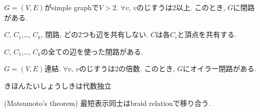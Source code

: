 
\begin{prop}
  $G=(V,E)$がsimple graphで$V>2$.
  $\forall v$, $v$のじすうは2以上.
  このとき, $G$に閉路がある.
\end{prop}

\begin{prop}
  $C$, $C_1$,\ldots, $C_k$, 閉路, どの2つも辺を共有しない.
  $C$は各$C_i$と頂点を共有する.

  $C$, $C_1$,\ldots, $C_k$の全ての辺を使った閉路がある.
\end{prop}


\begin{prop}
  $G=(V,E)$連結.
  $\forall v$, $v$のじすうは2の倍数.
  このとき, $G$にオイラー閉路がある.
\end{prop}



\begin{prop}
きほんたいしょうしきは代数独立
\end{prop}

\begin{prop}
  (Matsumoto's theorem)
最短表示同士はbraid relationで移り合う.
\end{prop}
